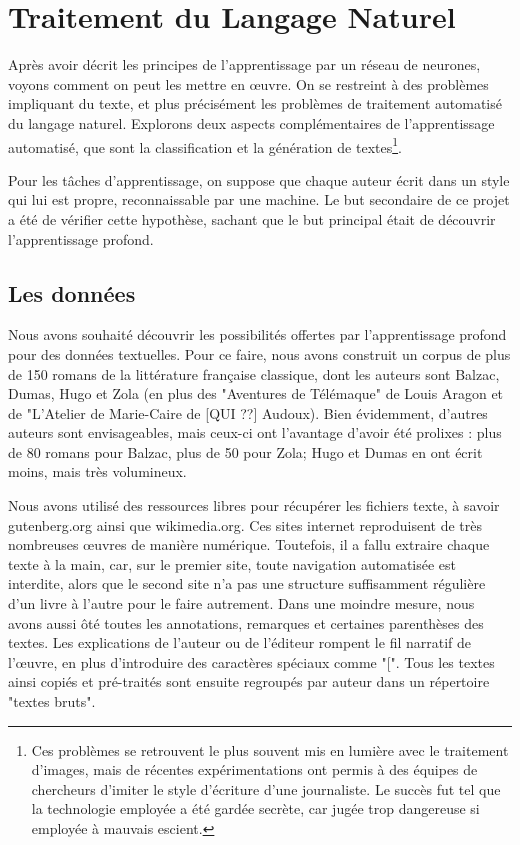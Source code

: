 \chapter{Traitement du Langage Naturel}

Après avoir décrit les principes de l'apprentissage par un réseau de neurones, voyons comment on peut les mettre en œuvre. On se restreint à des problèmes impliquant du texte, et plus précisément les problèmes de traitement automatisé du langage naturel. Explorons deux aspects complémentaires de l'apprentissage automatisé, que sont la classification et la génération de textes\footnote{Ces problèmes se retrouvent le plus souvent mis en lumière avec le traitement d'images, mais de récentes expérimentations ont permis à des équipes de chercheurs d'imiter le style d'écriture d'une journaliste. Le succès fut tel que la technologie employée a été gardée secrète, car jugée trop dangereuse si employée à mauvais escient.}.

Pour les tâches d'apprentissage, on suppose que chaque auteur écrit dans un style qui lui est propre, reconnaissable par une machine. Le but secondaire de ce projet a été de vérifier cette hypothèse, sachant que le but principal était de découvrir l'apprentissage profond.

\section{Les données}
Nous avons souhaité découvrir les possibilités offertes par l'apprentissage profond pour des données textuelles. Pour ce faire, nous avons construit un corpus de plus de 150 romans de la littérature française classique, dont les auteurs sont Balzac, Dumas, Hugo et Zola (en plus des "Aventures de Télémaque" de Louis Aragon et de "L'Atelier de Marie-Caire de [QUI ??] Audoux). Bien évidemment, d'autres auteurs sont envisageables, mais ceux-ci ont l'avantage d'avoir été prolixes : plus de 80 romans pour Balzac, plus de 50 pour Zola; Hugo et Dumas en ont écrit moins, mais très volumineux.

Nous avons utilisé des ressources libres pour récupérer les fichiers texte, à savoir gutenberg.org ainsi que wikimedia.org. Ces sites internet reproduisent de très nombreuses œuvres de manière numérique. Toutefois, il a fallu extraire chaque texte à la main, car, sur le premier site, toute navigation automatisée est interdite, alors que le second site n'a pas une structure suffisamment régulière d'un livre à l'autre pour le faire autrement. Dans une moindre mesure, nous avons aussi ôté toutes les annotations, remarques et certaines parenthèses des textes. Les explications de l'auteur ou de l'éditeur rompent le fil narratif de l'œuvre, en plus d'introduire des caractères spéciaux comme "[". Tous les textes ainsi copiés et pré-traités sont ensuite regroupés par auteur dans un répertoire "textes bruts".

